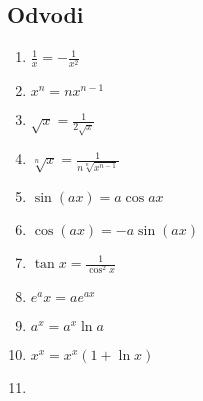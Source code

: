 \subsection{Odvodi}
\begin{center}
    \begin{small}
        \begin{enumerate}
            \item \begin{math}
                \frac{1}{x} = -\frac{1}{x^2}
            \end{math}
            \item \begin{math}
                x^n  = nx^{n-1}
            \end{math}
            \item \begin{math}
                \sqrt{x} = \frac{1}{2 \sqrt{x}}
            \end{math}
            \item \begin{math}
                \sqrt[n] x = \frac{1}{n \sqrt[n]{x^{n-1}}}
            \end{math}
            \item \begin{math}
                \sin (a x) =  a  \cos a x
            \end{math}
            \item  \begin{math}
                \cos (a x) = - a \sin (a x)
            \end{math}
            \item \begin{math}
                \tan x = \frac{1}{\cos^2 x} 
            \end{math}
            \item \begin{math}
                e^ax = ae^{ax}
            \end{math}
            \item \begin{math}
                a^x = a^x \ln a
            \end{math}
            \item \begin{math}
                x^x = x^x (1+\ln x)
            \end{math}
            \item \begin{math}

\end{math}
\end{enumerate}
\end{small}
\end{center}
